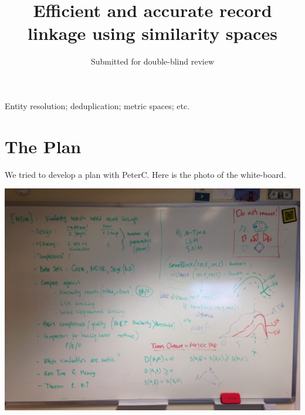 \documentclass{llncs}
\begin{document}
\title{Efficient and accurate record linkage using similarity spaces}

\author{Submitted for double-blind review}

\maketitle

\begin{abstract}

\end{abstract}

\keywords Entity resolution; deduplication; metric spaces; etc.


\section{The Plan}

We tried to develop a plan with PeterC. Here is the photo of the white-board.

\includegraphics[width=\textwidth]{2017-08-01_12_08_43.jpg}
\end{document}
